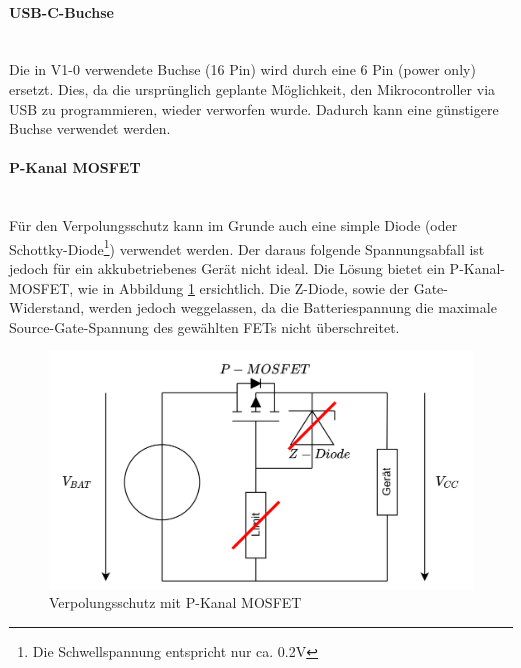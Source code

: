 \documentclass[12pt]{article}
\begin{document}
	\paragraph{USB-C-Buchse}\mbox{}\\
	Die in V1-0 verwendete Buchse (16 Pin) wird durch eine 6 Pin (power only) ersetzt. Dies, da die ursprünglich geplante Möglichkeit, den Mikrocontroller via USB zu programmieren, wieder verworfen wurde. Dadurch kann eine günstigere Buchse verwendet werden.
	\paragraph{P-Kanal MOSFET} \label{P-Kanal MOSFET} \mbox{}\\
	Für den Verpolungsschutz kann im Grunde auch eine simple Diode (oder Schottky-Diode\footnote{Die Schwellspannung entspricht nur ca. 0.2V}) verwendet werden. Der daraus folgende Spannungsabfall ist jedoch für ein akkubetriebenes Gerät nicht ideal. Die Lösung bietet ein P-Kanal-MOSFET, wie in Abbildung \ref{fig:batverpolungsschutz} ersichtlich. Die Z-Diode, sowie der Gate-Widerstand, werden jedoch weggelassen, da die Batteriespannung die maximale Source-Gate-Spannung des gewählten FETs nicht überschreitet.
	\begin{figure}[H]
		\centering
		\includegraphics[width=0.7\linewidth]{images/BAT_Verpolungsschutz}
		\caption{Verpolungsschutz mit P-Kanal MOSFET}
		\label{fig:batverpolungsschutz}
	\end{figure}
	
\end{document}
